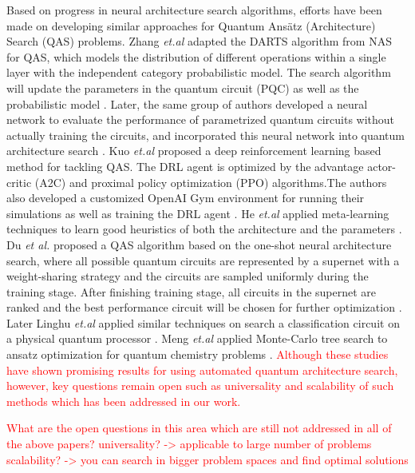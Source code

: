 \documentclass[a4paper,onecolumn,11pt]{quantumarticle}
\begin{document}
Based on progress in neural architecture search algorithms, efforts have been made on developing similar approaches for Quantum Ans\"atz (Architecture) Search (QAS) problems. Zhang \textit{et.al} adapted the DARTS algorithm \cite{DARTS_DBLP:conf/iclr/LiuSY19} from NAS for QAS, which models the distribution of different operations within a single layer with the independent category probabilistic model. The search algorithm will update the parameters in the  quantum circuit (PQC) as well as the probabilistic model \cite{zhang2021differentiable}. Later, the same group of authors developed a neural network to evaluate the performance of parametrized quantum circuits without actually training the circuits, and incorporated this neural network into quantum architecture search \cite{zhang2021neural}. Kuo \textit{et.al} proposed a deep reinforcement learning based method for tackling QAS. The DRL agent is optimized by the advantage actor-critic (A2C) and proximal policy optimization (PPO) algorithms.The authors also developed a customized OpenAI Gym environment \cite{OpenAIGYMDBLP:journals/corr/BrockmanCPSSTZ16} for running their simulations as well as training the DRL agent \cite{kuo2021quantum}. He \textit{et.al} applied meta-learning techniques to learn good heuristics of both the architecture and the parameters \cite{chen2021quantum}. Du \textit{et al.} proposed a QAS algorithm based on the one-shot neural architecture search, where all possible quantum circuits are represented by a supernet with a weight-sharing strategy and the circuits are sampled uniformly during the training stage. After finishing training stage, all circuits in the supernet are ranked and the best performance circuit will be chosen for further optimization \cite{du2020quantum}. Later Linghu \textit{et.al} applied similar techniques on search a classification circuit on a physical quantum processor \cite{Linghu2022-yy}. Meng \textit{et.al} applied Monte-Carlo tree search to ansatz optimization for quantum chemistry problems \cite{9566740mctsqas}. \textcolor{red}{Although these studies have shown promising results for using automated quantum architecture search, however, key questions remain open such as universality and scalability of such methods which has been addressed in our work.}

\textcolor{red}{What are the open questions in this area which are still not addressed in all of the above papers?
universality? -> applicable to large number of problems
scalability? -> you can search in bigger problem spaces and find optimal solutions}
\end{document}
